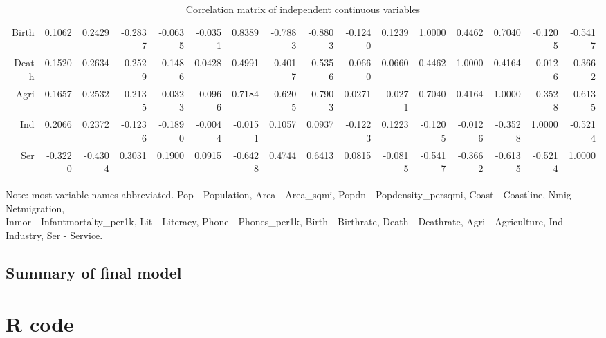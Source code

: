\documentclass[12pt,a4paper]{article}
\renewcommand\texttt[1]{{\ttfamily\color{ttcolor}#1}}
\begin{document}
\begin{landscape}
\begin{table}[ht]
\begin{tabular}{r|rrrrrrrrrrrrrrr}
  Birth & 0.1062 & 0.2429 & -0.2837 & -0.0635 & -0.0351 & 0.8389 & -0.7883 & -0.8803 & -0.1240 & 0.1239 & 1.0000 & 0.4462 & 0.7040 & -0.1205 & -0.5417 \\ 
  Death & 0.1520 & 0.2634 & -0.2529 & -0.1486 & 0.0428 & 0.4991 & -0.4017 & -0.5356 & -0.0660 & 0.0660 & 0.4462 & 1.0000 & 0.4164 & -0.0126 & -0.3662 \\ 
  Agri & 0.1657 & 0.2532 & -0.2135 & -0.0323 & -0.0966 & 0.7184 & -0.6205 & -0.7903 & 0.0271 & -0.0271 & 0.7040 & 0.4164 & 1.0000 & -0.3528 & -0.6135 \\ 
  Ind & 0.2066 & 0.2372 & -0.1236 & -0.1890 & -0.0044 & -0.0151 & 0.1057 & 0.0937 & -0.1223 & 0.1223 & -0.1205 & -0.0126 & -0.3528 & 1.0000 & -0.5214 \\ 
  Ser & -0.3220 & -0.4304 & 0.3031 & 0.1900 & 0.0915 & -0.6428 & 0.4744 & 0.6413 & 0.0815 & -0.0815 & -0.5417 & -0.3662 & -0.6135 & -0.5214 & 1.0000 \\
   \hline

   \hline
\end{tabular}
\caption{Correlation matrix of independent continuous variables}
\label{cor}
\end{table}

Note: most variable names abbreviated. Pop - \texttt{Population}, Area - \texttt{Area\_sqmi}, Popdn - \texttt{Popdensity\_persqmi}, Coast - \texttt{Coastline}, Nmig - \texttt{Netmigration}, \\ Inmor - \texttt{Infantmortalty\_per1k},  Lit - \texttt{Literacy}, Phone - \texttt{Phones\_per1k}, Birth - \texttt{Birthrate}, Death - \texttt{Deathrate}, Agri - \texttt{Agriculture}, Ind - \texttt{Industry}, Ser - \texttt{Service}.
\end{landscape}



\subsection{Summary of final model} \label{finalmodel}


\pagebreak
\section{R code}

\end{document}
